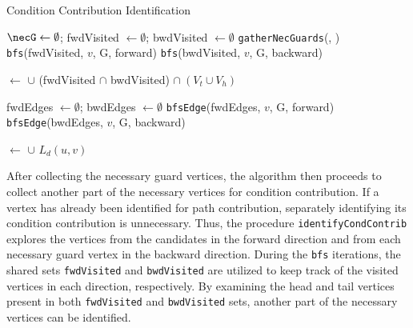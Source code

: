 \begin{algorithm}[t]\small
  \caption{Condition Contribution Identification}
  \label{alg:condition}
   {
    $\necG \leftarrow \emptyset$; {fwdVisited} $\leftarrow \emptyset$; {bwdVisited} $\leftarrow \emptyset $\;
    \texttt{gatherNecGuards}(\Vn, \necG)\;
     {
        \texttt{bfs}({fwdVisited}, $v$, G, forward)\;
    }
     {
        \texttt{bfs}({bwdVisited}, $v$, G, backward)\;
    }

    \Vn $\leftarrow$ \Vn $\cup$ ({fwdVisited} $\cap$ {bwdVisited}) $\cap\ (V_{t} \cup V_{h})$\;
    
  }
  
  \Proc{\Q{\Vn, \necG}} {
        {fwdEdges} $\leftarrow \emptyset$; {bwdEdges} $\leftarrow \emptyset$\;
         {
            \texttt{bfsEdge}({fwdEdges}, $v$, G, forward)\;
        }
         {
            \texttt{bfsEdge}({bwdEdges}, $v$, G, backward)\;
        }
        
         {
            \necG $\leftarrow $ \necG $ \cup $ $ L_d(u, v)$\;
        }
  }
\end{algorithm}

After collecting the necessary guard vertices, 
the algorithm then proceeds to collect another part of the necessary vertices for condition contribution.
If a vertex has already been identified for path contribution, separately identifying its condition contribution is unnecessary.
Thus, the procedure \texttt{identifyCondContrib} explores the vertices from the candidates in the forward direction and from each necessary guard vertex in the backward direction.
During the \texttt{bfs} iterations, the shared sets \texttt{fwdVisited} and \texttt{bwdVisited} are utilized to keep track of the visited vertices in each direction, respectively. 
By examining the head and tail vertices present in both \texttt{fwdVisited} and \texttt{bwdVisited} sets, another part of the necessary vertices can be identified.


